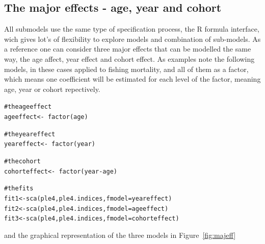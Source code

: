 \documentclass[a4paper,english,10pt]{article}\usepackage[]{graphicx}\usepackage[]{color}
\makeatletter
\newcommand{\hlcom}[1]{\textcolor[rgb]{0.2,0.267,0.4}{#1}}%
\newcommand{\hlopt}[1]{\textcolor[rgb]{0.2,0.2,0.2}{#1}}%
\newcommand{\hlstd}[1]{\textcolor[rgb]{0,0,0}{#1}}%
\newcommand{\hlkwb}[1]{\textcolor[rgb]{0.361,0.506,0.596}{#1}}%
\newcommand{\hlkwc}[1]{\textcolor[rgb]{0.361,0.506,0.596}{#1}}%
\newcommand{\hlkwd}[1]{\textcolor[rgb]{0.361,0.506,0.596}{#1}}%
\newenvironment{kframe}{%
 \def\at@end@of@kframe{}%
 \ifinner\ifhmode%
  \def\at@end@of@kframe{\end{minipage}}%
  \begin{minipage}{\columnwidth}%
 \fi\fi%
 \def\FrameCommand##1{\hskip\@totalleftmargin \hskip-\fboxsep
 \colorbox{shadecolor}{##1}\hskip-\fboxsep
     \hskip-\linewidth \hskip-\@totalleftmargin \hskip\columnwidth}%
 \MakeFramed {\advance\hsize-\width
   \@totalleftmargin\z@ \linewidth\hsize
   \@setminipage}}%
 {\par\unskip\endMakeFramed%
 \at@end@of@kframe}
\newenvironment{knitrout}{}{} %
\makeatother
\begin{document}
\subsection{The major effects - age, year and cohort}

All submodels use the same type of specification process, the R formula interface, wich gives lot's of flexibility to explore models and combination of sub-models. As a reference one can consider three major effects that can be modelled the same way, the age affect, year effect and cohort effect. As examples note the following models, in these cases applied to fishing mortality, and all of them as a factor, which means one coefficient will be estimated for each level of the factor, meaning age, year or cohort repectively.

\begin{knitrout}
\color{fgcolor}\begin{kframe}
\begin{alltt}
\hlcom{# the age effect}
\hlstd{ageeffect} \hlkwb{<-} \hlopt{~} \hlkwd{factor}\hlstd{(age)}

\hlcom{# the year effect}
\hlstd{yeareffect} \hlkwb{<-} \hlopt{~} \hlkwd{factor}\hlstd{(year)}

\hlcom{# the cohort }
\hlstd{cohorteffect} \hlkwb{<-} \hlopt{~} \hlkwd{factor}\hlstd{(year}\hlopt{-}\hlstd{age)}

\hlcom{# the fits}
\hlstd{fit1} \hlkwb{<-} \hlkwd{sca}\hlstd{(ple4, ple4.indices,} \hlkwc{fmodel}\hlstd{=yeareffect)}
\hlstd{fit2} \hlkwb{<-} \hlkwd{sca}\hlstd{(ple4, ple4.indices,} \hlkwc{fmodel}\hlstd{=ageeffect)}
\hlstd{fit3} \hlkwb{<-} \hlkwd{sca}\hlstd{(ple4, ple4.indices,} \hlkwc{fmodel}\hlstd{=cohorteffect)}
\end{alltt}
\end{kframe}
\end{knitrout}

and the graphical representation of the three models in Figure~\ref{fig:majeff}
\end{document}

